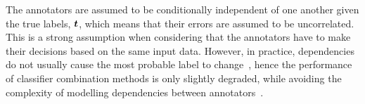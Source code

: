 The annotators are assumed to be conditionally independent of one another given the true labels,
$\boldsymbol t$, which means that their errors are assumed to be uncorrelated. This is a strong assumption
when considering that the annotators have to make their decisions based
on the same input data. However, in practice, dependencies do not usually cause the 
most probable label to change~\citep{zhang2004optimality}, hence the performance of classifier combination methods 
is only slightly degraded, while avoiding the complexity of modelling dependencies between annotators~\citep{kim2012bayesian}.
%
%
%

